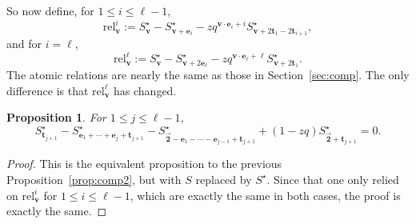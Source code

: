 \documentclass[10pt,a4paper]{amsart}
\numberwithin{equation}{section}
\newtheorem{Proposition}[Theorem]{Proposition}
\theoremstyle{definition}
\newcommand{\rel}{\text{rel}}
\newcommand{\tr}{\mathbf{t}}
\newcommand{\vv}{\mathbf{v}}
\newcommand{\ee}{\mathbf{e}}
\newcommand{\two}{\vec{\mathbf{2}}}
\begin{document}
So now define, for $1\le i \le \ell-1$,
\begin{equation*}
\rel^i_\vv:=S^\star_\vv - S^\star_{\vv+\ee_i} - zq^{\vv\cdot\ee_i+i} S^\star_{\vv+2\tr_1-2\tr_{i+1}},
\end{equation*}
and for $i=\ell$,
\begin{equation*}
\rel^\ell_\vv:=S^\star_\vv - S^\star_{\vv+2\ee_\ell} - zq^{\vv\cdot\ee_\ell+\ell} S^\star_{\vv+2\tr_1}.
\end{equation*}
The atomic relations are nearly the same as those in Section~\ref{sec:comp}. The only difference is that $\rel^\ell_\vv$ has changed.

\begin{Proposition} \label{prop:comp2_AB}
For $1 \le j \le \ell-1$,
\begin{equation*}
S^\star_{\tr_{j+1}} -S^\star_{\ee_1+\cdots+\ee_{j}+\tr_{j+1}}- S^\star_{\two-\ee_1-\cdots-\ee_{j-1}+\tr_{j+1}} + (1-zq)S^\star_{\two+\tr_{j+1}}=0.
\end{equation*}
\end{Proposition}
\begin{proof}
This is the equivalent proposition to the previous Proposition~\ref{prop:comp2}, but with $S$ replaced by $S^\star$. Since that one only relied on $\rel^i_\vv$ for $1\le i \le \ell-1$, which are exactly the same in both cases, the proof is exactly the same.
\end{proof}
\end{document}
